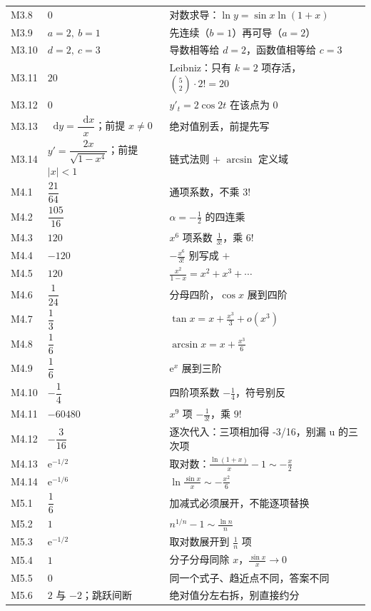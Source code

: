 \documentclass[11pt,a4paper]{ctexart}
\newcommand{\ee}{\mathrm{e}}
\newcommand{\dd}{\mathop{}\!\mathrm{d}}
\begin{document}
{\begin{longtable}{@{}p{1.35cm}p{6.3cm}p{7.6cm}@{}}
M3.8 & $0$ & 对数求导：$\ln y=\sin x\ln(1+x)$ \\
M3.9 & $a=2,\ b=1$ & 先连续（$b=1$）再可导（$a=2$） \\
M3.10 & $d=2,\ c=3$ & 导数相等给 $d=2$，函数值相等给 $c=3$ \\
M3.11 & $20$ & Leibniz：只有 $k=2$ 项存活，$\binom52\cdot2!=20$ \\
M3.12 & $0$ & $y\prime_t=2\cos2t$ 在该点为 $0$ \\
M3.13 & $\dd y=\dfrac{\dd x}{x}$；前提 $x\ne0$ & 绝对值别丢，前提先写 \\
M3.14 & $y\prime=\dfrac{2x}{\sqrt{1-x^{4}}}$；前提 $|x|<1$ & 链式法则 + $\arcsin$ 定义域 \\
M4.1 & $\dfrac{21}{64}$ & 通项系数，不乘 $3!$ \\
M4.2 & $\dfrac{105}{16}$ & $\alpha=-\frac12$ 的四连乘 \\
M4.3 & $120$ & $x^{6}$ 项系数 $\frac1{3!}$，乘 $6!$ \\
M4.4 & $-120$ & $-\frac{x^{6}}{3!}$ 别写成 $+$ \\
M4.5 & $120$ & $\frac{x^2}{1-x}=x^{2}+x^{3}+\cdots$ \\
M4.6 & $\dfrac1{24}$ & 分母四阶，$\cos x$ 展到四阶 \\
M4.7 & $\dfrac13$ & $\tan x=x+\frac{x^{3}}3+o(x^{3})$ \\
M4.8 & $\dfrac16$ & $\arcsin x=x+\frac{x^{3}}6$ \\
M4.9 & $\dfrac16$ & $\ee^x$ 展到三阶 \\
M4.10 & $-\dfrac14$ & 四阶项系数 $-\frac14$，符号别反 \\
M4.11 & $-60480$ & $x^{9}$ 项 $-\frac1{3!}$，乘 $9!$ \\
M4.12 & $-\dfrac{3}{16}$ & 逐次代入：三项相加得 -3/16，别漏 u 的三次项 \\
M4.13 & $\ee^{-1/2}$ & 取对数：$\frac{\ln(1+x)}x-1\sim-\frac x2$ \\
M4.14 & $\ee^{-1/6}$ & $\ln\frac{\sin x}x\sim-\frac{x^{2}}6$ \\
M5.1 & $\dfrac16$ & 加减式必须展开，不能逐项替换 \\
M5.2 & $1$ & $n^{1/n}-1\sim\frac{\ln n}n$ \\
M5.3 & $\ee^{-1/2}$ & 取对数展开到 $\frac1n$ 项 \\
M5.4 & $1$ & 分子分母同除 $x$，$\frac{\sin x}x\to0$ \\
M5.5 & $0$ & 同一个式子、趋近点不同，答案不同 \\
M5.6 & $2$ 与 $-2$；跳跃间断 & 绝对值分左右拆，别直接约分 \\

\end{longtable}}
\end{document}
